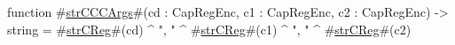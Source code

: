 function #\hyperref[sailMIPSzstrCCCArgs]{strCCCArgs}#(cd : CapRegEnc, c1 : CapRegEnc, c2 : CapRegEnc) -> string = #\hyperref[sailMIPSzstrCReg]{strCReg}#(cd) ^ ", " ^ #\hyperref[sailMIPSzstrCReg]{strCReg}#(c1) ^ ", " ^ #\hyperref[sailMIPSzstrCReg]{strCReg}#(c2)
